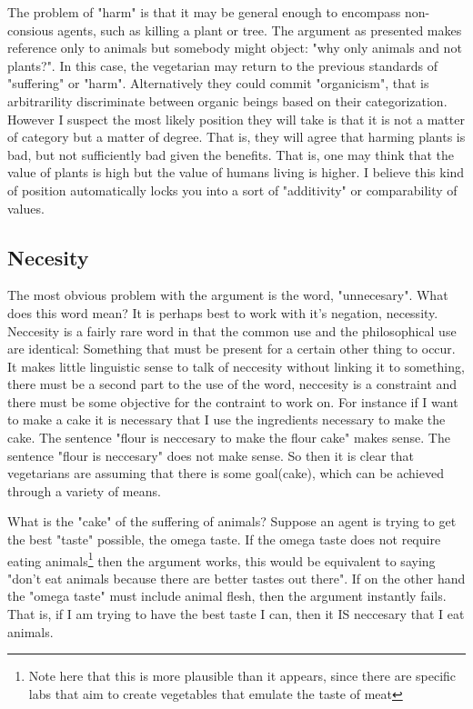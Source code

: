 \documentclass[12pt]{report}
\numberwithin{equation}{section}
\begin{document}
The problem of "harm" is that it may be general enough to encompass non-consious agents, such as killing a plant or tree. The argument as presented makes reference only to animals but somebody might object: "why only animals and not plants?". In this case, the vegetarian may return to the previous standards of "suffering" or "harm". Alternatively they could commit "organicism", that is arbitrarility discriminate between organic beings based on their categorization. However I suspect the most likely position they will take is that it is not a matter of category but a matter of degree. That is, they will agree that harming plants is bad, but not sufficiently bad given the benefits. That is, one may think that the value of plants is high but the value of humans living is higher. I believe this kind of position automatically locks you into a sort of  "additivity" or comparability of values. 



\subsection{Necesity}

The most obvious problem with the argument is the word, "unnecesary". What does this word mean? It is perhaps best to work with it's negation, necessity. Neccesity is a fairly rare word in that the common use and the philosophical use are identical: Something that must be present for a certain other thing to occur. It makes little linguistic sense to talk of neccesity without linking it to something, there must be a second part to the use of the word, neccesity is a constraint and there must be some objective for the contraint to work on. For instance if I want to make a cake it is necessary that I use the ingredients necessary to make the cake. The sentence "flour is neccesary to make the flour cake" makes sense. The sentence "flour is neccesary" does not make sense. So then it is clear that vegetarians are assuming that there is some goal(cake), which can be achieved through a variety of means. 

What is the "cake" of the suffering of animals? Suppose an agent is trying to get the best "taste" possible, the omega taste. If the omega taste does not require eating animals\footnote{Note here that this is more plausible than it appears, since there are specific labs that aim to create vegetables that emulate the taste of meat} then the argument works, this would be equivalent to saying "don't eat animals because there are better tastes out there". If on the other hand the "omega taste" must include animal flesh, then the argument instantly fails. That is, if I am trying to have the best taste I can, then it IS neccesary that I eat animals. 
\end{document}
